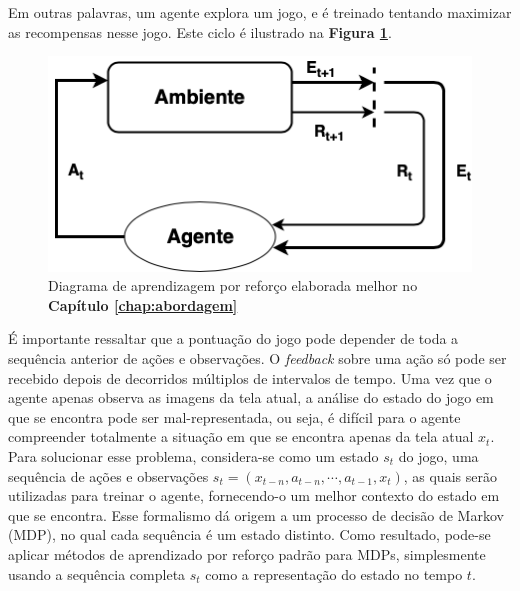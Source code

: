 Em outras palavras, um agente explora um jogo, e é treinado tentando maximizar as recompensas nesse jogo. Este ciclo é ilustrado na \textbf{Figura \ref{rl-diagram-2}}.

\begin{figure}[h]
  \centering
  \includegraphics[width=.6 \textwidth]{conteudo/imgs/rl-diagram.png}
  \caption[Diagrama de aprendizagem por reforço]{Diagrama de aprendizagem por reforço elaborada melhor no \textbf{Capítulo \ref{chap:abordagem}}
  }
  \label{rl-diagram-2}
\end{figure}




É importante ressaltar que a pontuação do jogo pode depender de toda a sequência anterior de ações e observações. O \textit{feedback} sobre uma ação só pode ser recebido depois de decorridos múltiplos de intervalos de tempo. Uma vez que o agente apenas observa as imagens da tela atual, a análise do estado do jogo em que se encontra pode ser mal-representada, ou seja, é difícil para o agente compreender totalmente a situação em que se encontra apenas da tela atual $x_t$. 
Para solucionar esse problema, considera-se como um estado $s_t$ do jogo, uma sequência de ações e observações $s_t = (x_{t-n},a_{t-n},\cdots,a_{t-1},x_t)$, as quais serão utilizadas para treinar o agente, fornecendo-o um melhor contexto do estado em que se encontra. Esse formalismo dá origem a um processo de decisão de Markov (MDP), no qual cada sequência é um estado distinto. Como resultado, pode-se aplicar métodos de aprendizado por reforço padrão para MDPs, simplesmente usando a sequência completa $s_t$ como a representação do estado no tempo $t$.

